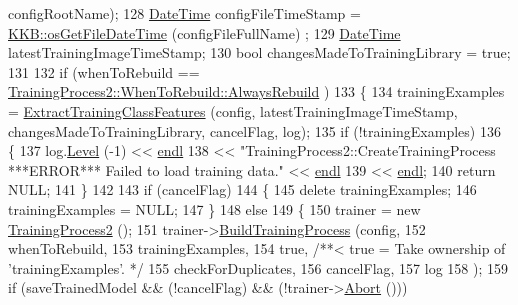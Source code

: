 \begin{DoxyCode}
      configRootName);
128   \hyperlink{class_k_k_b_1_1_date_time}{DateTime}  configFileTimeStamp = \hyperlink{namespace_k_k_b_a0c28dcf4ba36d924a50454c84aee3931}{KKB::osGetFileDateTime} (configFileFullName)
      ;
129   \hyperlink{class_k_k_b_1_1_date_time}{DateTime}  latestTrainingImageTimeStamp;
130   \textcolor{keywordtype}{bool}      changesMadeToTrainingLibrary = \textcolor{keyword}{true};    
131 
132   \textcolor{keywordflow}{if}  (whenToRebuild == \hyperlink{class_k_k_m_l_l_1_1_training_process2_acc48e76f6978c8c8c0c849eec2d0ee53af19cc2f24e3b601e28ca877505de0d4b}{TrainingProcess2::WhenToRebuild::AlwaysRebuild}
      )
133   \{
134     trainingExamples = \hyperlink{class_k_k_m_l_l_1_1_training_process2_aa1f7422d93e5db2d5f540d657b14720f}{ExtractTrainingClassFeatures} (config, 
      latestTrainingImageTimeStamp, changesMadeToTrainingLibrary, cancelFlag, log);
135     \textcolor{keywordflow}{if}  (!trainingExamples)
136     \{
137       log.\hyperlink{class_k_k_b_1_1_run_log_a32cf761d7f2e747465fd80533fdbb659}{Level} (-1) << \hyperlink{namespace_k_k_b_ad1f50f65af6adc8fa9e6f62d007818a8}{endl}
138         << \textcolor{stringliteral}{"TrainingProcess2::CreateTrainingProcess   ***ERROR***  Failed to load training data."} << 
      \hyperlink{namespace_k_k_b_ad1f50f65af6adc8fa9e6f62d007818a8}{endl}
139         << \hyperlink{namespace_k_k_b_ad1f50f65af6adc8fa9e6f62d007818a8}{endl};
140       \textcolor{keywordflow}{return} NULL;
141     \}
142 
143     \textcolor{keywordflow}{if}  (cancelFlag)
144     \{
145       \textcolor{keyword}{delete} trainingExamples;
146       trainingExamples = NULL;
147     \}
148     \textcolor{keywordflow}{else}
149     \{
150       trainer = \textcolor{keyword}{new} \hyperlink{class_k_k_m_l_l_1_1_training_process2_a56455bc6c87316ccfd3afbe4c3323f5e}{TrainingProcess2} ();
151       trainer->\hyperlink{class_k_k_m_l_l_1_1_training_process2_a8b80079d09f7813e347343ebbefb14fb}{BuildTrainingProcess} (config,
152                                      whenToRebuild,
153                                      trainingExamples,
154                                      \textcolor{keyword}{true},                 \textcolor{comment}{/**<  true = Take ownership of
       'trainingExamples'. */}
155                                      checkForDuplicates,
156                                      cancelFlag,
157                                      log
158                                     );
159       \textcolor{keywordflow}{if}  (saveTrainedModel  &&   (!cancelFlag)  &&  (!trainer->\hyperlink{class_k_k_m_l_l_1_1_training_process2_a11725f4aac3b45c7a070bc78aa406724}{Abort} ()))

\end{DoxyCode}
